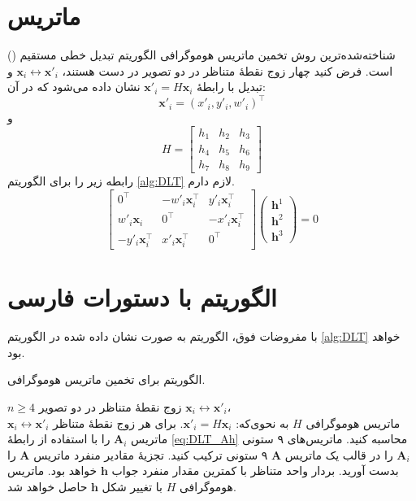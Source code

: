 \section{ماتریس}

شناخته‌شده‌ترین روش تخمین ماتریس هوموگرافی الگوریتم تبدیل خطی مستقیم () است.  فرض کنید چهار زوج نقطهٔ متناظر در دو تصویر در دست هستند،  $\mathbf{x}_i\leftrightarrow\mathbf{x}'_i$   و تبدیل با رابطهٔ
  $\mathbf{x}'_i = H\mathbf{x}_i$
  نشان داده می‌شود که در آن:
\[\mathbf{x}'_i=(x'_i,y'_i,w'_i)^\top  \]
و
\[ H=\left[
\begin{array}{ccc}
h_1 & h_2 & h_3 \\ 
h_4 & h_5 & h_6 \\ 
h_7 & h_8 & h_9
\end{array} 
\right]\]
رابطه زیر را برای الگوریتم  \eqref{alg:DLT} لازم دارم.
\begin{equation}\label{eq:DLT_Ah}
\left[
\begin{array}{ccc}
0^\top & -w'_i\mathbf{x}_i^\top & y'_i\mathbf{x}_i^\top \\ 
w'_i\mathbf{x}_i & 0^\top & -x'_i\mathbf{x}_i^\top \\ 
- y'_i\mathbf{x}_i^\top & x'_i\mathbf{x}_i^\top & 0^\top
\end{array} 
\right]
\left(
\begin{array}{c}
\mathbf{h}^1 \\ 
\mathbf{h}^2 \\ 
\mathbf{h}^3
\end{array} 
\right)=0
\end{equation}

\section{الگوریتم با دستورات فارسی}
با مفروضات فوق، الگوریتم  به صورت نشان داده شده در الگوریتم \eqref{alg:DLT}  خواهد بود.
\begin{algorithm}[ht]
\onehalfspacing
\caption{الگوریتم  برای تخمین ماتریس هوموگرافی.} \label{alg:DLT}
\begin{algorithmic}[1]
\REQUIRE $n\geq4$ زوج نقطهٔ متناظر در دو تصویر 
${\mathbf{x}_i\leftrightarrow\mathbf{x}'_i}$،\\
\ENSURE ماتریس هوموگرافی $H$ به نحوی‌که: 
$\mathbf{x}'_i = H \mathbf{x}_i$.
  \STATE برای هر زوج نقطهٔ متناظر
$\mathbf{x}_i\leftrightarrow\mathbf{x}'_i$ 
ماتریس $\mathbf{A}_i$ را با استفاده از رابطهٔ \ref{eq:DLT_Ah} محاسبه کنید.
  \STATE ماتریس‌های ۹ ستونی  $\mathbf{A}_i$ را در قالب یک ماتریس $\mathbf{A}$ ۹ ستونی ترکیب کنید. 
  \STATE تجزیهٔ مقادیر منفرد   ماتریس $\mathbf{A}$ را بدست آورید. بردار واحد متناظر با کمترین مقدار منفرد جواب $\mathbf{h}$ خواهد بود.
  \STATE  ماتریس هوموگرافی $H$ با تغییر شکل $\mathbf{h}$ حاصل خواهد شد.
\end{algorithmic}
\end{algorithm}

